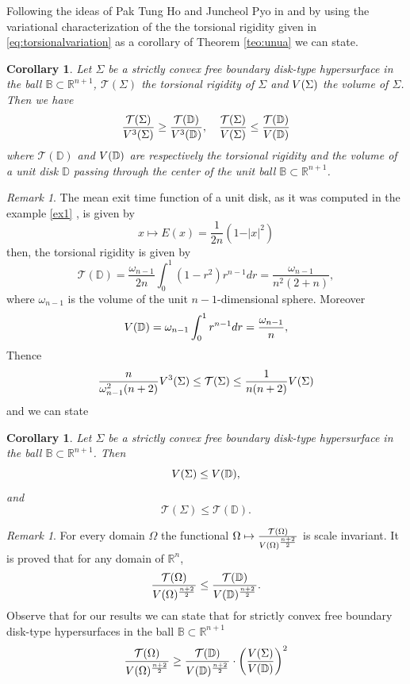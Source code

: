 \documentclass{amsart}
\newtheorem{corollary}[theorem]{Corollary}
\theoremstyle{definition}
\theoremstyle{remark}
\newtheorem{remark}[theorem]{Remark}
\newcommand{\V}{{\rm V}}
\begin{document}
Following the ideas of Pak Tung Ho and Juncheol Pyo in \cite{Ho-Pyo} and by using the variational characterization of the the torsional rigidity given in \eqref{eq:torsionalvariation} as a corollary of Theorem \ref{teo:unua} we can state.
\begin{corollary}Let $\Sigma$ be a strictly convex free boundary disk-type hypersurface  in the ball $\mathbb{B}\subset \mathbb{R}^{n+1}$, $\mathcal{T}(\Sigma)$ the torsional rigidity of $\Sigma$ and $\V(\Sigma)$ the volume of $\Sigma$. Then we have
$$
\frac{\mathcal{T}(\Sigma)}{\V^3(\Sigma)}\geq \frac{\mathcal{T}(\mathbb{D})}{\V^3(\mathbb{D})},\quad \frac{\mathcal{T}(\Sigma)}{\V(\Sigma)}\leq \frac{\mathcal{T}(\mathbb{D})}{\V(\mathbb{D})}
$$
where $\mathcal{T}(\mathbb{D})$ and $\V(\mathbb{D})$ are respectively the torsional rigidity and the volume of a unit disk $\mathbb{D}$ passing through the center of the unit ball $\mathbb{B}\subset \mathbb{R}^{n+1}$.
\end{corollary}
\begin{remark}
    The mean exit time function of a unit disk, as it was computed in the example \ref{ex1} , is given by
    $$
x\mapsto E(x)=\frac{1}{2n}\left(1-\vert x\vert ^2\right)
    $$
then, the torsional rigidity is given by
$$
\mathcal{T}(\mathbb{D})=\frac{\omega_{n-1}}{2n}\int_0^1\left(1-r ^2\right)r^{n-1}dr=\frac{\omega_{n-1}}{n^2(2+n)},
$$
where $\omega_{n-1}$ is the volume of the unit $n-1$-dimensional sphere. Moreover
$$
\V(\mathbb{D})=\omega_{n-1}\int_0^1r^{n-1}dr=\frac{\omega_{n-1}}{n},
$$
Thence
$$
\frac{n}{\omega_{n-1}^2(n+2)}\V^3(\Sigma)\leq \mathcal{T}(\Sigma)\leq \frac{1}{n(n+2)}\V(\Sigma)
$$
and we can state
\begin{corollary}
    Let $\Sigma$ be a strictly convex free boundary disk-type hypersurface  in the ball $\mathbb{B}\subset \mathbb{R}^{n+1}$. Then
    $$
\V(\Sigma)\leq \V(\mathbb{D}),
    $$
    and
    $$
\mathcal{T}(\Sigma)\leq \mathcal{T}(\mathbb{D}).
    $$
\end{corollary}
\end{remark}
\begin{remark}
    For every domain $\Omega$ the functional $\Omega\mapsto \frac{\mathcal{T}(\Omega)}{\V(\Omega)^\frac{n+2}{2}}$ is scale invariant. 
It is proved that for any domain of $\mathbb{R}^n$,
$$
\frac{\mathcal{T}(\Omega)}{\V(\Omega)^\frac{n+2}{2}}\leq \frac{\mathcal{T}(\mathbb{D})}{\V(\mathbb{D})^\frac{n+2}{2}}.
$$
Observe that for our results we can state that for strictly convex free boundary disk-type hypersurfaces  in the ball $\mathbb{B}\subset \mathbb{R}^{n+1}$
$$
\frac{\mathcal{T}(\Omega)}{\V(\Omega)^\frac{n+2}{2}}\geq \frac{\mathcal{T}(\mathbb{D})}{\V(\mathbb{D})^\frac{n+2}{2}}\cdot \left(\frac{\V(\Sigma)}{\V(\mathbb{D})}\right)^2
$$
\end{remark}
\end{document}
